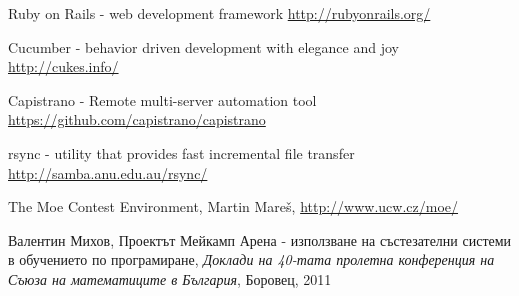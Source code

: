 \documentclass[a4paper,12pt]{article}
\begin{document}
\begin{thebibliography}{99}
      Ruby on Rails - web development framework \url{http://rubyonrails.org/}
      
      Cucumber - behavior driven development with elegance and joy \url{http://cukes.info/}
    
      Capistrano - Remote multi-server automation tool \url{https://github.com/capistrano/capistrano}
      
      rsync - utility that provides fast incremental file transfer \url{http://samba.anu.edu.au/rsync/}
      
      The Moe Contest Environment, Martin Mareš, \url{http://www.ucw.cz/moe/}
      
      Валентин Михов, Проектът Мейкамп Арена - използване на състезателни системи в обучението по програмиране, \textit{Доклади на 40-тата пролетна конференция на Съюза на математиците в България}, Боровец, 2011
  \end{thebibliography}
\end{document}
